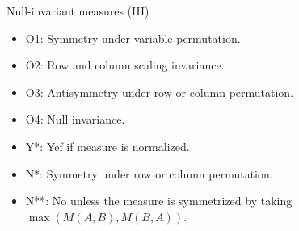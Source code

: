 \documentclass[aspectratio=169,t,xcolor=dvipsnames]{beamer}
\begin{document}
  {
    \begin{frame}{Null-invariant measures (III)}
      \centering
    \begin{itemize}
      \item O1: Symmetry under variable permutation.
      \item O2: Row and column scaling invariance.
      \item O3: Antisymmetry under row or column permutation.
      \item O4: Null invariance.
      \item Y*: Yef if measure is normalized.
      \item N*: Symmetry under row or column permutation.
      \item N**: No unless the measure is symmetrized by taking $\max(M(A,B),M(B,A))$.
    \end{itemize}
    \end{frame}
  }
\end{document}
